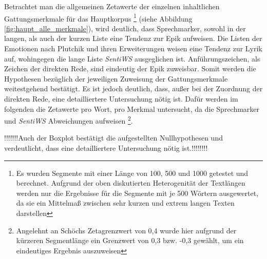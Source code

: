 \documentclass[a4paper,10p]{article}
\begin{document}
Betrachtet man die allgemeinen Zetawerte der einzelnen inhaltlichen Gattungsmerkmale für das Hauptkorpus \footnote{Es wurden Segmente mit einer Länge von 100, 500 und 1000 getestet und berechnet. Aufgrund der oben diskutierten Heterogenität der Textlängen werden nur die Ergebnisse für die Segmente mit je 500 Wörtern ausgewertet, da sie ein Mittelmaß zwischen sehr kurzen und extrem langen Texten darstellen} (siehe Abbildung  \ref{fig:haupt_alle_merkmale}), wird deutlich, dass Sprechmarker, sowohl in der langen, als auch der kurzen Liste eine Tendenz zur Epik aufweisen. Die Listen der Emotionen nach Plutchik und ihren Erweiterungen weisen eine Tendenz zur Lyrik auf, wohingegen die lange Liste \textit{SentiWS} ausgeglichen ist. Anführungszeichen, als Zeichen der direkten Rede, sind eindeutig der Epik zuweisbar. Somit werden die Hypothesen bezüglich der jeweiligen Zuweisung der Gattungsmerkmale weitestgehend bestätigt. Es ist jedoch deutlich, dass, außer bei der Zuordnung der direkten Rede, eine detailliertere Untersuchung nötig ist. Dafür werden im folgenden die Zetawerte pro Wort, pro Merkmal untersucht, da die Sprechmarker und \textit{SentiWS} Abweichungen aufweisen \footnote{Angelehnt an Schöchs Zetagrenzwert von 0,4 wurde hier aufgrund der kürzeren Segmentlänge ein Grenzwert von 0,3 bzw. -0,3 gewählt, um ein eindeutiges Ergebnis auszuweisen}.\par 


!!!!!!!Auch der Boxplot bestätigt die aufgestellten Nullhypothesen und verdeutlicht, dass eine detailliertere Untersuchung nötig ist.!!!!!!!!\\
\end{document}
